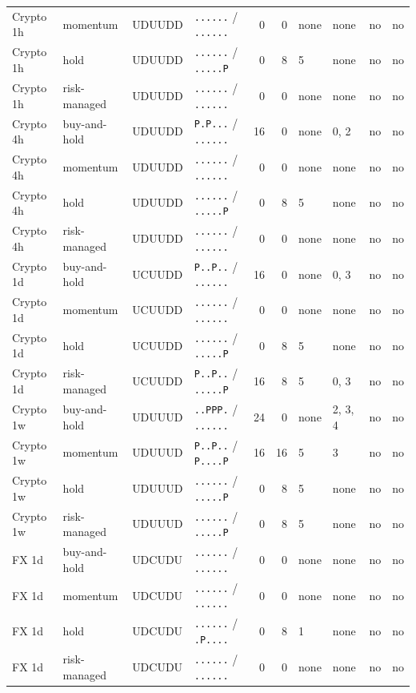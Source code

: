 \begin{table}[t]
\begin{tabular}{llllrrllcc}
Crypto 1h & momentum & UDUUDD & \texttt{......} / \texttt{......} & 0 & 0 & none & none & no & no \\
Crypto 1h & hold & UDUUDD & \texttt{......} / \texttt{.....P} & 0 & 8 & 5 & none & no & no \\
Crypto 1h & risk-managed & UDUUDD & \texttt{......} / \texttt{......} & 0 & 0 & none & none & no & no \\
Crypto 4h & buy-and-hold & UDUUDD & \texttt{P.P...} / \texttt{......} & 16 & 0 & none & 0, 2 & no & no \\
Crypto 4h & momentum & UDUUDD & \texttt{......} / \texttt{......} & 0 & 0 & none & none & no & no \\
Crypto 4h & hold & UDUUDD & \texttt{......} / \texttt{.....P} & 0 & 8 & 5 & none & no & no \\
Crypto 4h & risk-managed & UDUUDD & \texttt{......} / \texttt{......} & 0 & 0 & none & none & no & no \\
Crypto 1d & buy-and-hold & UCUUDD & \texttt{P..P..} / \texttt{......} & 16 & 0 & none & 0, 3 & no & no \\
Crypto 1d & momentum & UCUUDD & \texttt{......} / \texttt{......} & 0 & 0 & none & none & no & no \\
Crypto 1d & hold & UCUUDD & \texttt{......} / \texttt{.....P} & 0 & 8 & 5 & none & no & no \\
Crypto 1d & risk-managed & UCUUDD & \texttt{P..P..} / \texttt{.....P} & 16 & 8 & 5 & 0, 3 & no & no \\
Crypto 1w & buy-and-hold & UDUUUD & \texttt{..PPP.} / \texttt{......} & 24 & 0 & none & 2, 3, 4 & no & no \\
Crypto 1w & momentum & UDUUUD & \texttt{P..P..} / \texttt{P....P} & 16 & 16 & 5 & 3 & no & no \\
Crypto 1w & hold & UDUUUD & \texttt{......} / \texttt{.....P} & 0 & 8 & 5 & none & no & no \\
Crypto 1w & risk-managed & UDUUUD & \texttt{......} / \texttt{.....P} & 0 & 8 & 5 & none & no & no \\
FX 1d & buy-and-hold & UDCUDU & \texttt{......} / \texttt{......} & 0 & 0 & none & none & no & no \\
FX 1d & momentum & UDCUDU & \texttt{......} / \texttt{......} & 0 & 0 & none & none & no & no \\
FX 1d & hold & UDCUDU & \texttt{......} / \texttt{.P....} & 0 & 8 & 1 & none & no & no \\
FX 1d & risk-managed & UDCUDU & \texttt{......} / \texttt{......} & 0 & 0 & none & none & no & no \\

\end{tabular}
\end{table}
